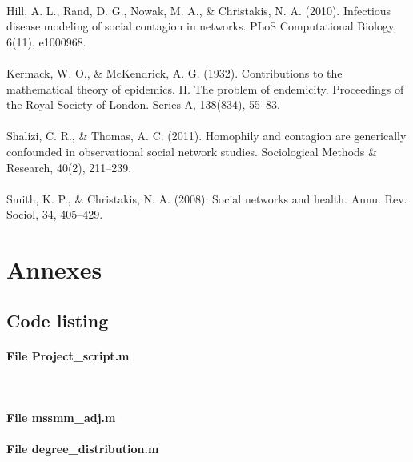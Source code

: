 \documentclass[11pt]{article}
\begin{document}
\paragraph{}
Hill, A. L., Rand, D. G., Nowak, M. A., \& Christakis, N. A. (2010). Infectious disease modeling of social contagion in networks. PLoS Computational Biology, 6(11), e1000968.
\paragraph{}
Kermack, W. O., \& McKendrick, A. G. (1932). Contributions to the mathematical theory of epidemics. II. The problem of endemicity. Proceedings of the Royal Society of London. Series A, 138(834), 55–83.
\paragraph{}
Shalizi, C. R., \& Thomas, A. C. (2011). Homophily and contagion are generically confounded in observational social network studies. Sociological Methods & Research, 40(2), 211–239.
\paragraph{}
Smith, K. P., \& Christakis, N. A. (2008). Social networks and health. Annu. Rev. Sociol, 34, 405–429.

\newpage
\section{Annexes}
\subsection{Code listing}
\lstset{breaklines=true}

\paragraph{File Project\_script.m} \


\paragraph{File mssmm\_adj.m}


\paragraph{File degree\_distribution.m} \

\end{document}
